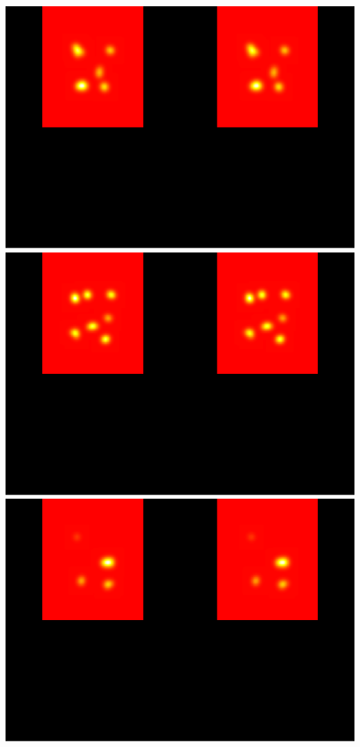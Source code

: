 \documentclass[]{article}
\begin{document}
\includegraphics{tapas-vignette_files/figure-latex/unnamed-chunk-11-4.pdf}
\includegraphics{tapas-vignette_files/figure-latex/unnamed-chunk-11-5.pdf}
\includegraphics{tapas-vignette_files/figure-latex/unnamed-chunk-11-6.pdf}
\end{document}
